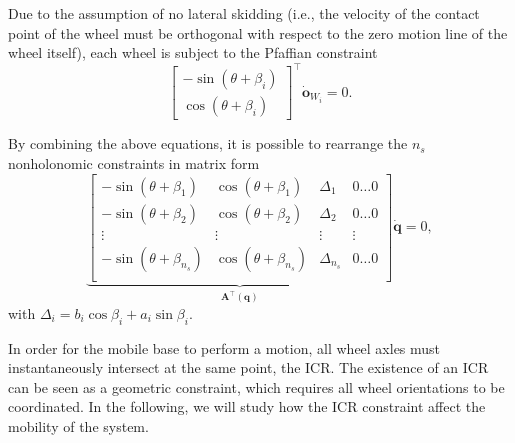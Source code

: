 Due to the assumption of no lateral skidding (i.e., the velocity of the contact point of the wheel must be orthogonal with respect to the zero motion line of the wheel itself), each wheel is subject to the Pfaffian constraint
\begin{equation}
    \label{eq:no-lateral-skidding-constraint}
    \begin{bmatrix}
        -\sin(\theta + \beta_i) \\
         \cos(\theta + \beta_i)
    \end{bmatrix}^\top \dot{\bm{o}}_{W_i} = 0.
\end{equation}

By combining the above equations, it is possible to rearrange the $n_s$ nonholonomic constraints in matrix form
\begin{equation}
    \label{eq:pfaffian-constraints-matrix-form}
    \underbrace{
    \begin{bmatrix}
        -\sin(\theta + \beta_1) &
        \cos(\theta + \beta_1) &
        \Delta_1 &
        0 \dots 0 \\
        -\sin(\theta + \beta_2) &
        \cos(\theta + \beta_2) &
        \Delta_2 &
        0 \dots 0 \\
        \vdots & \vdots & \vdots & \vdots \\
        -\sin(\theta + \beta_{n_s}) &
        \cos(\theta + \beta_{n_s}) &
        \Delta_{n_s} &
        0 \dots 0 \\
    \end{bmatrix}
    }_{\bm{A}^\top(\bm{q})}
    \dot{\bm{q}} = 0,
\end{equation}
with $\Delta_i = b_i \cos\beta_i + a_i \sin\beta_i$.

In order for the mobile base to perform a motion, all wheel axles must instantaneously intersect at the same point, the ICR. The existence of an ICR can be seen as a geometric constraint, which requires all wheel orientations to be coordinated. In the following, we will study how the ICR constraint affect the mobility of the system.

